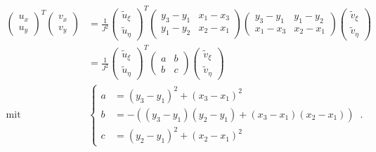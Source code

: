 \begin{align*}
	\begin{pmatrix} u_x \\ u_y \end{pmatrix}^T \begin{pmatrix} v_x \\ v_y \end{pmatrix} & = \frac 1{J^2} \begin{pmatrix} \tilde u_\xi \\ \tilde u_\eta \end{pmatrix}^T \begin{pmatrix}
				y_3-y_1 & x_1-x_3 \\
				y_1-y_2 & x_2-x_1
			\end{pmatrix}  \begin{pmatrix}
				y_3-y_1 & y_1-y_2 \\
				x_1-x_3 & x_2-x_1
			\end{pmatrix}  \begin{pmatrix} \tilde v_\xi \\ \tilde v_\eta \end{pmatrix} \\
	& = \frac 1{J^2} \begin{pmatrix} \tilde u_\xi \\ \tilde u_\eta \end{pmatrix}^T     \begin{pmatrix}
				a & b \\
				b & c
			\end{pmatrix}    \begin{pmatrix} \tilde v_\xi \\ \tilde v_\eta \end{pmatrix} \\
	\text{mit }\qquad  & \!\!\!\!\!\!\!\!\!\!  \left\{ \begin{aligned}
			a & = (y_3-y_1)^2+ (x_3-x_1)^2 \\
			b  & = -( (y_3-y_1)(y_2-y_1) + (x_3-x_1)(x_2-x_1)) \\
			c & = (y_2-y_1)^2 + (x_2-x_1)^2
		\end{aligned} \right. \, .
\end{align*}

